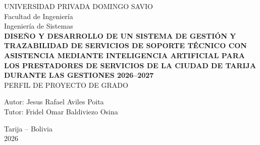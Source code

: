 \begin{titlepage}
\begin{center}
\vspace*{1cm}
{\large UNIVERSIDAD PRIVADA DOMINGO SAVIO}\\[0.4cm]
{\large Facultad de Ingeniería}\\[0.3cm]
{\large Ingeniería de Sistemas}\\[2cm]

{\bfseries\Large DISEÑO Y DESARROLLO DE UN SISTEMA DE GESTIÓN Y TRAZABILIDAD DE SERVICIOS DE SOPORTE TÉCNICO CON ASISTENCIA MEDIANTE INTELIGENCIA ARTIFICIAL PARA LOS PRESTADORES DE SERVICIOS DE LA CIUDAD DE TARIJA DURANTE LAS GESTIONES 2026--2027}\\[2cm]

{\large PERFIL DE PROYECTO DE GRADO}\\[2cm]

\begin{flushright}
Autor: Jesus Rafael Aviles Poita\\[0.5cm]
Tutor: Fridel Omar Baldiviezo Osina
\end{flushright}

\vfill
{\large Tarija -- Bolivia}\\
{\large 2026}
\end{center}
\end{titlepage}